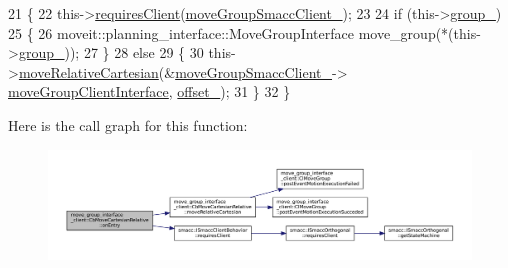 \begin{DoxyCode}
21 \{
22   this->\hyperlink{classsmacc_1_1ISmaccClientBehavior_a32b16e99e3b4cb289414203dc861a440}{requiresClient}(\hyperlink{classmove__group__interface__client_1_1CbMoveCartesianRelative_aaa8b86680f04a6cfd7ac6b42268bf04d}{moveGroupSmaccClient\_});
23 
24   \textcolor{keywordflow}{if} (this->\hyperlink{classmove__group__interface__client_1_1CbMoveCartesianRelative_a5da33d1b7d822c971f8e282e5ade7238}{group\_})
25   \{
26       moveit::planning\_interface::MoveGroupInterface move\_group(*(this->\hyperlink{classmove__group__interface__client_1_1CbMoveCartesianRelative_a5da33d1b7d822c971f8e282e5ade7238}{group\_}));
27   \}
28   \textcolor{keywordflow}{else}
29   \{
30       this->\hyperlink{classmove__group__interface__client_1_1CbMoveCartesianRelative_a85b6b1c8738c372174dff8fd98ec1b7a}{moveRelativeCartesian}(&\hyperlink{classmove__group__interface__client_1_1CbMoveCartesianRelative_aaa8b86680f04a6cfd7ac6b42268bf04d}{moveGroupSmaccClient\_}->
      \hyperlink{classmove__group__interface__client_1_1ClMoveGroup_a5f0ea9b52695661b17605691168d1f31}{moveGroupClientInterface}, \hyperlink{classmove__group__interface__client_1_1CbMoveCartesianRelative_affe67c635e1cd77013609a784ac53b92}{offset\_});
31   \}
32 \}
\end{DoxyCode}
Here is the call graph for this function\+:
\nopagebreak
\begin{figure}[H]
\begin{center}
\leavevmode
\includegraphics[width=350pt]{classmove__group__interface__client_1_1CbMoveCartesianRelative_a549d1612f552cab64208c37b7e383e1c_cgraph}
\end{center}
\end{figure}
\mbox{\label{classmove__group__interface__client_1_1CbMoveCartesianRelative_a100d2d75fa5d74cc5b15087100658fb8}} 
